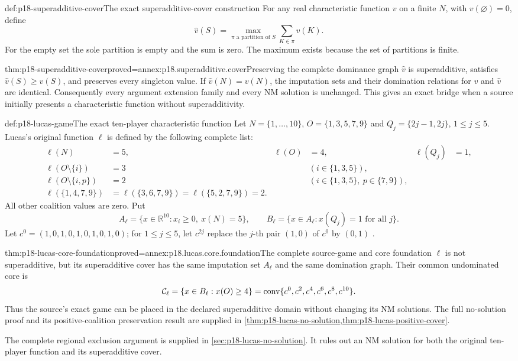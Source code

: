 \begin{hbdefinition}{def:p18-superadditive-cover}{The exact superadditive-cover construction}
For any real characteristic function \(v\)
on a finite \(N\), with \(v(\varnothing)=0\),
define
\[
 \widehat v(S)=\max_{\pi\text{ a partition of }S}
                              \sum_{K\in\pi}v(K).
\]
For the empty set the sole partition
is empty and the sum is zero.
The maximum exists because the
set of partitions is finite.
\end{hbdefinition}

\begin{hbtheorem}{thm:p18-superadditive-cover}{proved=annex:p18.superadditive.cover}{Preserving the complete dominance graph}
\(\widehat v\) is superadditive, satisfies
\(\widehat v(S)\geq v(S)\), and preserves
every singleton value. If
\(\widehat v(N)=v(N)\), the imputation
sets and their domination relations
for \(v\) and \(\widehat v\) are
identical. Consequently every argument
extension family and every NM solution
is unchanged. This gives an exact
bridge when a source initially presents
a characteristic function without
superadditivity.
\end{hbtheorem}

\begin{hbdefinition}{def:p18-lucas-game}{The exact ten-player characteristic function}
Let \(N=\{1,\ldots,10\}\),
\(O=\{1,3,5,7,9\}\) and
\(Q_j=\{2j-1,2j\}\), \(1\leq j\leq5\).
Lucas's original function \(\ell\) is
defined by the following complete list:
\[
\begin{aligned}
 \ell(N)&=5,&\ell(O)&=4,&\ell(Q_j)&=1,\\
 \ell(O\setminus\{i\})&=3
       &&(i\in\{1,3,5\}),\\
 \ell(O\setminus\{i,p\})&=2
       &&(i\in\{1,3,5\},\ p\in\{7,9\}),\\
 \ell(\{1,4,7,9\})&=\ell(\{3,6,7,9\})
                    =\ell(\{5,2,7,9\})=2.
\end{aligned}
\]
All other coalition values are zero.
Put
\[
 A_\ell=\{x\in\mathbb R^{10}:x_i\geq0,\ x(N)=5\},
 \qquad B_\ell=\{x\in A_\ell:x(Q_j)=1\text{ for all }j\}.
\]
Let \(c^0=(1,0,1,0,1,0,1,0,1,0)\);
for \(1\leq j\leq5\), let \(c^{2j}\)
replace the \(j\)-th pair \((1,0)\)
of \(c^0\) by \((0,1)\)
\cite[sec.~3, pp.~4--5]{Lucas1968NoSolutionProof}.
\end{hbdefinition}

\begin{hbtheorem}{thm:p18-lucas-core-foundation}{proved=annex:p18.lucas.core.foundation}{The complete source-game and core foundation}
\(\ell\) is not superadditive, but its
superadditive cover has the same
imputation set \(A_\ell\) and the
same domination graph. Their common
undominated core is
\[
 {\cal C}_\ell
   =\{x\in B_\ell:x(O)\geq4\}
   =\operatorname{conv}\{c^0,c^2,c^4,c^6,c^8,c^{10}\}.
\]
Thus the source's exact game can be
placed in the declared superadditive
domain without changing its NM
solutions. The full no-solution proof and its positive-coalition
preservation result are supplied in
\cref{thm:p18-lucas-no-solution,thm:p18-lucas-positive-cover}.
\end{hbtheorem}

The complete regional exclusion argument is supplied in
\cref{sec:p18-lucas-no-solution}. It rules out an NM solution
for both the original ten-player function and its superadditive cover.

